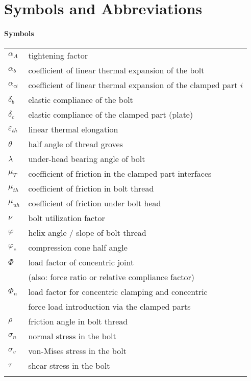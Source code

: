 \chapter*{Symbols and Abbreviations}

\subsubsection*{Symbols}
\begin{longtable}{p{2cm} l}
  $\alpha_A$ & tightening factor \\
  $\alpha_b$ & coefficient of linear thermal expansion of the bolt \\
  $\alpha_{ci}$ & coefficient of linear thermal expansion of the clamped part $i$ \\
  $\delta_b$ & elastic compliance of the bolt \\
  $\delta_c$ & elastic compliance of the clamped part (plate) \\
  $\varepsilon_{th}$ & linear thermal elongation \\
  $\theta$ & half angle of thread groves \\
  $\lambda$ & under-head bearing angle of bolt \\
  $\mu_T$ & coefficient of friction in the clamped part interfaces \\
  $\mu_{th}$ & coefficient of friction in bolt thread \\
  $\mu_{uh}$ & coefficient of friction under bolt head \\
  $\nu$ & bolt utilization factor \\
  $\varphi$ & helix angle / slope of bolt thread \\
  $\varphi_c$ & compression cone half angle \\
  $\Phi$ & load factor of concentric joint \\
         & (also: force ratio or relative compliance factor) \\
  $\Phi_n$ & load factor for concentric clamping and concentric \\
           & force load introduction via the clamped parts \\
  $\rho$ & friction angle in bolt thread \\
  $\sigma_n$ & normal stress in the bolt \\
  $\sigma_v$ & von-Mises stress in the bolt \\
  $\tau$ & shear stress in the bolt \\
  & \\

\end{longtable}
